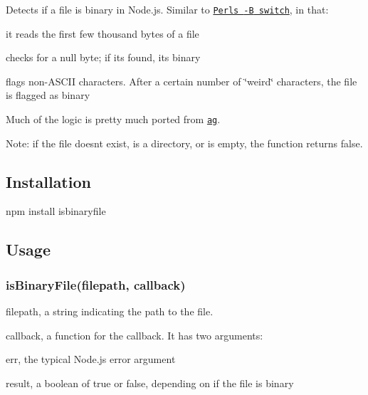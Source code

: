Detects if a file is binary in Node.\+js. Similar to \href{http://stackoverflow.com/questions/899206/how-does-perl-know-a-file-is-binary}{\tt Perl\textquotesingle{}s {\ttfamily -\/B} switch}, in that\+:
\begin{DoxyItemize}
\item it reads the first few thousand bytes of a file
\item checks for a {\ttfamily null} byte; if it\textquotesingle{}s found, it\textquotesingle{}s binary
\item flags non-\/\+A\+S\+C\+II characters. After a certain number of \char`\"{}weird\char`\"{} characters, the file is flagged as binary
\end{DoxyItemize}

Much of the logic is pretty much ported from \href{https://github.com/ggreer/the_silver_searcher}{\tt ag}.

Note\+: if the file doesn\textquotesingle{}t exist, is a directory, or is empty, the function returns {\ttfamily false}.

\subsection*{Installation}


\begin{DoxyCode}
npm install isbinaryfile
\end{DoxyCode}


\subsection*{Usage}

\subsubsection*{is\+Binary\+File(filepath, callback)}


\begin{DoxyItemize}
\item {\ttfamily filepath}, a {\ttfamily string} indicating the path to the file.
\item {\ttfamily callback}, a {\ttfamily function} for the callback. It has two arguments\+:
\begin{DoxyItemize}
\item {\ttfamily err}, the typical Node.\+js error argument
\item {\ttfamily result}, a {\ttfamily boolean} of {\ttfamily true} or {\ttfamily false}, depending on if the file is binary
\end{DoxyItemize}
\end{DoxyItemize}

